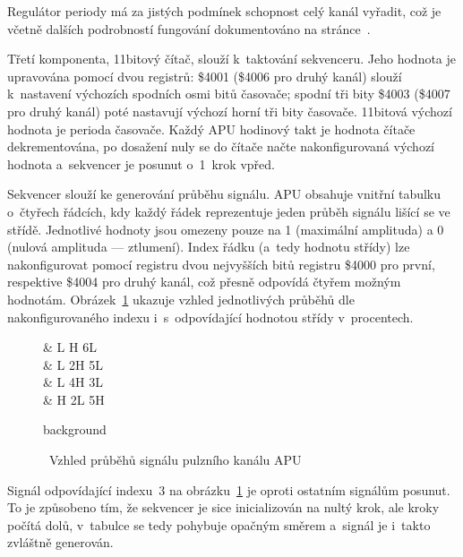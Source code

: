 Regulátor periody má za jistých podmínek schopnost celý kanál vyřadit, což je včetně dalších podrobností fungování dokumentováno na stránce~\cite{Nesdev:apu-sweep}.

Třetí komponenta, 11bitový čítač, slouží k~taktování sekvenceru. Jeho hodnota je upravována pomocí dvou registrů: \$4001 (\$4006 pro druhý kanál) slouží k~nastavení výchozích spodních osmi bitů časovače; spodní tři bity \$4003 (\$4007 pro druhý kanál) poté nastavují výchozí horní tři bity časovače. 11bitová výchozí hodnota je perioda časovače. Každý APU hodinový takt je hodnota čítače dekrementována, po dosažení nuly se do čítače načte nakonfigurovaná výchozí hodnota a~sekvencer je posunut o~1~krok vpřed.~\cite{Nesdev:apu-pulse}

Sekvencer slouží ke generování průběhu signálu. APU obsahuje vnitřní tabulku o~čtyřech řádcích, kdy každý řádek reprezentuje jeden průběh signálu lišící se ve střídě. Jednotlivé hodnoty jsou omezeny pouze na 1 (maximální amplituda) a 0 (nulová amplituda --- ztlumení). Index řádku (a~tedy hodnotu střídy) lze nakonfigurovat pomocí registru dvou nejvyšších bitů registru \$4000 pro první, respektive \$4004 pro druhý kanál, což přesně odpovídá čtyřem možným hodnotám. Obrázek~\ref{fig:apu-signaly} ukazuje vzhled jednotlivých průběhů dle nakonfigurovaného indexu i~s~odpovídající hodnotou střídy v~procentech.~\cite{Nesdev:apu-pulse}

\begin{figure}[ht!]
	\centering
	\caption{~Vzhled průběhů signálu pulzního kanálu APU}\label{fig:apu-signaly}
	\begin{tikztimingtable}[%
		timing/dslope=0.1,
		timing/.style={x=5ex,y=3ex},
		x=5ex,
		timing/rowdist=4ex,
		timing/name/.style={font=\sffamily\scriptsize}
		]
		 & L H 6L \\
		 & L 2H 5L \\
		 & L 4H 3L \\
		 & H 2L 5H \\
		\extracode
		\begin{pgfonlayer}{background}
			\begin{scope}
			\end{scope}
		\end{pgfonlayer}
	\end{tikztimingtable}
\end{figure}

\begin{note}
	Signál odpovídající indexu~3 na obrázku~\ref{fig:apu-signaly} je oproti ostatním signálům posunut. To je způsobeno tím, že sekvencer je sice inicializován na nultý krok, ale kroky počítá dolů, v~tabulce se tedy pohybuje opačným směrem a~signál je i~takto zvláštně generován.~\cite{Nesdev:apu-pulse}
\end{note}

